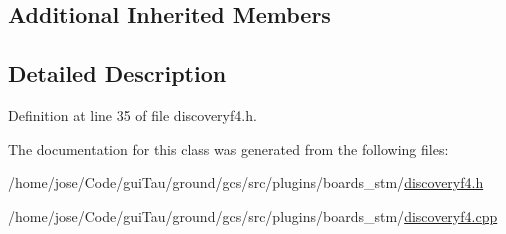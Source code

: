 \subsection*{Additional Inherited Members}


\subsection{Detailed Description}


Definition at line 35 of file discoveryf4.\-h.



The documentation for this class was generated from the following files\-:\begin{DoxyCompactItemize}
\item 
/home/jose/\-Code/gui\-Tau/ground/gcs/src/plugins/boards\-\_\-stm/\hyperlink{discoveryf4_8h}{discoveryf4.\-h}\item 
/home/jose/\-Code/gui\-Tau/ground/gcs/src/plugins/boards\-\_\-stm/\hyperlink{discoveryf4_8cpp}{discoveryf4.\-cpp}\end{DoxyCompactItemize}
